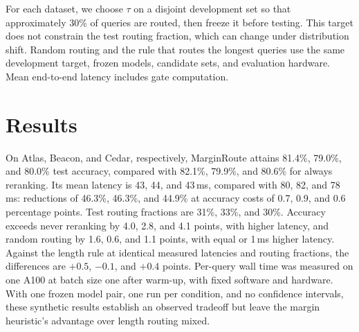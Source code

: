\documentclass[11pt]{article}
\begin{document}
For each dataset, we choose $\tau$ on a disjoint development set so that approximately 30\% of queries are routed, then freeze it before testing. This target does not constrain the test routing fraction, which can change under distribution shift. Random routing and the rule that routes the longest queries use the same development target, frozen models, candidate sets, and evaluation hardware. Mean end-to-end latency includes gate computation.

\section{Results}
\label{sec:results}
On Atlas, Beacon, and Cedar, respectively, MarginRoute attains 81.4\%, 79.0\%, and 80.0\% test accuracy, compared with 82.1\%, 79.9\%, and 80.6\% for always reranking. Its mean latency is 43, 44, and 43\,ms, compared with 80, 82, and 78\,ms: reductions of 46.3\%, 46.3\%, and 44.9\% at accuracy costs of 0.7, 0.9, and 0.6 percentage points. Test routing fractions are 31\%, 33\%, and 30\%. Accuracy exceeds never reranking by 4.0, 2.8, and 4.1 points, with higher latency, and random routing by 1.6, 0.6, and 1.1 points, with equal or 1\,ms higher latency. Against the length rule at identical measured latencies and routing fractions, the differences are $+0.5$, $-0.1$, and $+0.4$ points. Per-query wall time was measured on one A100 at batch size one after warm-up, with fixed software and hardware. With one frozen model pair, one run per condition, and no confidence intervals, these synthetic results establish an observed tradeoff but leave the margin heuristic's advantage over length routing mixed.
\end{document}
